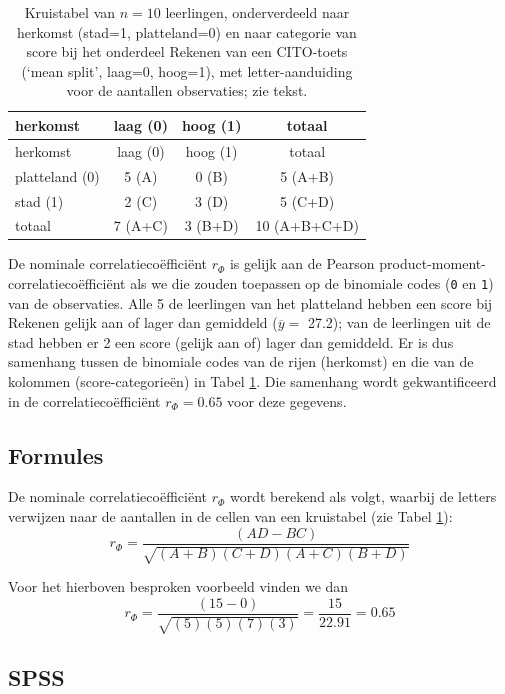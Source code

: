 \documentclass[
]{book}
\begin{document}
\begin{longtable}[]{@{}lccc@{}}
\caption{\label{tab:cito-kruis} Kruistabel van \(n=10\) leerlingen, onderverdeeld naar herkomst
(stad=1, platteland=0) en naar categorie van score bij het onderdeel Rekenen van een
CITO-toets (`mean split', laag=0, hoog=1), met letter-aanduiding voor de aantallen
observaties; zie tekst.}\tabularnewline
\toprule\noalign{}
herkomst & laag (0) & hoog (1) & totaal \\
\midrule\noalign{}
\endfirsthead
\toprule\noalign{}
herkomst & laag (0) & hoog (1) & totaal \\
\midrule\noalign{}
\endhead
\bottomrule\noalign{}
\endlastfoot
platteland (0) & 5 (A) & 0 (B) & 5 (A+B) \\
stad (1) & 2 (C) & 3 (D) & 5 (C+D) \\
totaal & 7 (A+C) & 3 (B+D) & 10 (A+B+C+D) \\
\end{longtable}

De nominale correlatiecoëfficiënt \(r_\Phi\) is gelijk aan de Pearson
product-moment-correlatiecoëfficiënt als we die zouden toepassen op de binomiale codes
(\texttt{0} en \texttt{1}) van de observaties. Alle 5 de leerlingen van het platteland
hebben een score bij Rekenen gelijk aan of lager dan gemiddeld
(\(\overline{y}=\) 27.2); van de leerlingen uit de stad hebben er 2 een score
(gelijk aan of) lager dan gemiddeld. Er is dus samenhang tussen de
binomiale codes van de rijen (herkomst) en die van de kolommen
(score-categorieën) in Tabel \ref{tab:cito-kruis}.
Die samenhang wordt gekwantificeerd in de
correlatiecoëfficiënt \(r_\Phi=0.65\) voor deze gegevens.

\subsection{Formules}\label{formules-5}

De nominale correlatiecoëfficiënt \(r_\Phi\) wordt berekend als volgt,
waarbij de letters verwijzen naar de aantallen in de cellen van een
kruistabel (zie Tabel \ref{tab:cito-kruis}):
\begin{equation}
    r_\Phi = \frac{(AD-BC)}{\sqrt{(A+B)(C+D)(A+C)(B+D)}}
  \label{eq:phi}
\end{equation}

Voor het hierboven besproken voorbeeld vinden we dan
\[
    r_\Phi = \frac{(15-0)}{\sqrt{(5)(5)(7)(3)}} = \frac{15}{22.91} = 0.65
\]

\subsection{SPSS}\label{spss-8}
\end{document}
